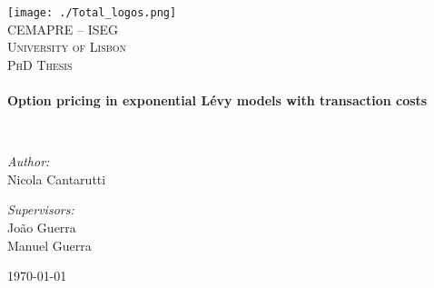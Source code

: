 \begin{titlepage}
\begin{center}


\texttt{[image: ./Total\_logos.png]}~\\[1cm]

\textsc{\Large CEMAPRE -- ISEG}\\[0.5cm]
\textsc{\Large University of Lisbon}\\[2cm]

\textsc{\LARGE PhD Thesis}\\[0.5cm]

\HRule \\[0.4cm]
{ \huge \bfseries Option pricing in exponential Lévy models with transaction costs \\[0.4cm] }

\HRule \\[1.5cm]

\noindent
\begin{minipage}{0.5\textwidth}
\begin{flushleft} \large
\emph{Author:}\\
Nicola Cantarutti
\end{flushleft}
\end{minipage}%
\begin{minipage}{0.5\textwidth}
\begin{flushright} \large
\emph{Supervisors:} \\
João Guerra\\
Manuel Guerra\\
\end{flushright}
\end{minipage}

\vfill

{\large \today}\\[0.3cm]

\end{center}
\end{titlepage}